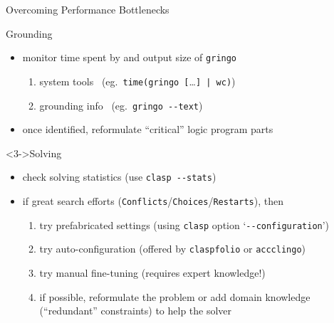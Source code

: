 \begin{frame}{Overcoming Performance Bottlenecks}
\begin{block}{Grounding}
\vspace*{-2mm}
\begin{itemize}
\item monitor \alert{time} spent by and output \alert{size} of \lstinline{gringo}
  \begin{enumerate}
  \item system tools   \ (eg.\ \lstinline{time(gringo [}\dots{}\lstinline{] | wc)})
  \item grounding info \ (eg.\ \lstinline{gringo --text})
  \end{enumerate}
  \item<2-> once identified, \alert{reformulate} ``critical'' logic program parts
\end{itemize}
\end{block}
\begin{block}<3->{Solving}
\vspace*{-2mm}
\begin{itemize}
\item check solving statistics (use \alert{\lstinline{clasp --stats}})
\item<4-> if great search efforts (\alert{\lstinline{Conflicts}}/\lstinline{Choices}/\lstinline{Restarts}), then
  \begin{enumerate}
  \item<5-> try prefabricated settings (using \lstinline{clasp} option `\lstinline{--configuration}')
  \item<5-> try auto-configuration (offered by \lstinline{claspfolio} or \lstinline{accclingo})
  \item<5-> try manual fine-tuning (requires expert knowledge!)
  \item<6-> if possible, reformulate the problem or add domain knowledge
            (``redundant'' constraints) to help the solver
  \end{enumerate}
\end{itemize}
\end{block}
\end{frame}
%
